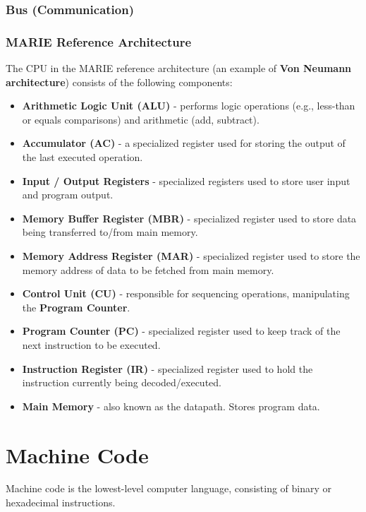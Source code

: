 \documentclass[pdftex,10pt]{article}
\begin{document}
\subsubsection{Bus (Communication)}

\subsubsection{MARIE Reference Architecture}
The CPU in the MARIE reference architecture (an example of \textbf{Von Neumann architecture}) consists of the following components:

\begin{itemize}
    \item \textbf{Arithmetic Logic Unit (ALU)} - performs logic operations (e.g., less-than or equals comparisons) and arithmetic (add, subtract).
    \item \textbf{Accumulator (AC)} - a specialized register used for storing the output of the last executed operation.
    \item \textbf{Input / Output Registers} - specialized registers used to store user input and program output.
    \item \textbf{Memory Buffer Register (MBR)} - specialized register used to store data being transferred to/from main memory.
    \item \textbf{Memory Address Register (MAR)} - specialized register used to store the memory address of data to be fetched from main memory.
    \item \textbf{Control Unit (CU)} - responsible for sequencing operations, manipulating the \textbf{Program Counter}.
    \item \textbf{Program Counter (PC)} - specialized register used to keep track of the next instruction to be executed.
    \item \textbf{Instruction Register (IR)} - specialized register used to hold the instruction currently being decoded/executed.
    \item \textbf{Main Memory} - also known as the datapath. Stores program data.
\end{itemize}


\section{Machine Code}

Machine code is the lowest-level computer language, consisting of binary or hexadecimal instructions.
\end{document}
